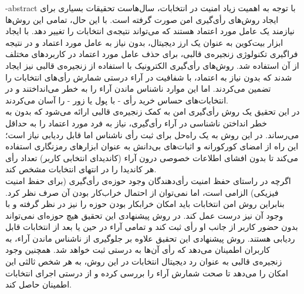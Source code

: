 \documentclass[oneside,openany,msc]{SBU-Thesis}
\begin{document}
	\fa-abstract{	
با توجه به اهمیت زیاد امنیت در انتخابات، سال‌هاست تحقیقات بسیاری برای ایجاد روش‌های رأی‌گیری امن صورت گرفته است. با این حال، تمامی این روش‌ها نیازمند یک عامل مورد اعتماد هستند که می‌تواند نتیجه‌ی انتخابات را تغییر دهد. با ایجاد ابزار بیت‌کوین به عنوان یک ارز دیجیتال، بدون نیاز به عامل مورد اعتماد و در نتیجه فراگیری تکنولوژی زنجیره‌ی‌ قالبی، برای حذف عامل مورد اعتماد در کاربردهای مختلف از آن استفاده شد. روش‌های رأی‌گیری الکترونیک با استفاده از زنجیره‌ی قالبی نیز ایجاد شدند که بدون نیاز به اعتماد، با شفافیت در آراء درستی شمارش رأی‌های انتخابات را تضمین می‌کردند. اما این موارد ناشناس ماندن آراء را به خطر می‌انداختند و در انتخابات‌های حساس خرید رأی - با پول یا زور - را آسان می‌کردند.
\\
در این تحقیق یک روش رأی‌گیری امن به کمک زنجیره‌ی قالبی ارائه می‌شود که بدون به خطر انداختن ناشناسی در آراء رأی‌گیری، نیاز به فرد مورد اعتماد را به حداقل می‌رساند. در این روش به یک راه‌حل برای ثبت رأی ناشناس اما قابل ردیابی نیاز است؛ این راه از امضای کورکورانه و اثبات‌های بی‌دانش به عنوان ابزارهای رمزنگاری استفاده می‌کند تا بدون افشای اطلاعات خصوصی درون آراء (کاندیدای انتخابی کاربر) تعداد رأی هر کاندیدا را در انتهای انتخابات مشخص کند.
\\
اگرچه در راستای حفظ امنیت رأی‌دهندگان وجود حوزه‌ی رأی‌گیری (برای حفظ امنیت فیزیکی) الزامی است، اما نمی‌توان از احتمال خراب‌کار بودن آن صرف نظر کرد. بنابراین روش امن انتخابات باید امکان خرابکار بودن حوزه را نیز در نظر گرفته و با وجود آن نیز درست عمل کند. در روش پیشنهادی این تحقیق هیچ حوزه‌ای نمی‌تواند بدون حضور کاربر از جانب او رأی ثبت کند و تمامی آراء در حین یا بعد از انتخابات قابل ردیابی هستند.
روش پیشنهادی این تحقیق علاوه بر جلوگیری از ناشناس ماندن آراء، به کاربران اطمینان می‌دهد که رأی آن‌ها به درستی ثبت خواهد شد. همچنین وجود زنجیره‌ی قالبی به عنوان رد دیجیتال انتخابات در این روش، به هر شخص ثالثی این امکان را می‌دهد تا صحت شمارش آراء را بررسی کرده و از درستی اجرای انتخابات اطمینان حاصل کند.
	}
	
\firstPage %
\davaranPage %
\end{document}
